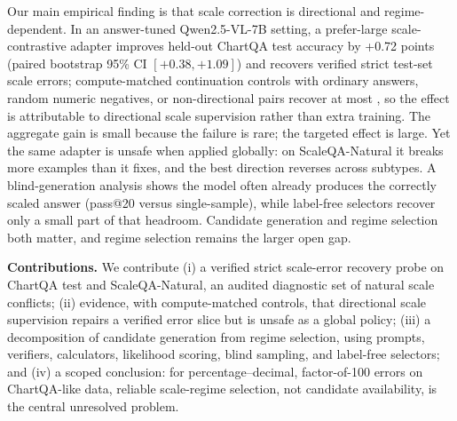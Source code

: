 Our main empirical finding is that scale correction is directional and regime-dependent. In an answer-tuned Qwen2.5-VL-7B setting, a prefer-large scale-contrastive adapter improves held-out ChartQA test accuracy by +0.72 points (paired bootstrap 95\% CI $[+0.38,+1.09]$) and recovers  verified strict test-set scale errors; compute-matched continuation controls with ordinary answers, random numeric negatives, or non-directional pairs recover at most , so the effect is attributable to directional scale supervision rather than extra training. The aggregate gain is small because the failure is rare; the targeted effect is large. Yet the same adapter is unsafe when applied globally: on ScaleQA-Natural it breaks more examples than it fixes, and the best direction reverses across subtypes. A blind-generation analysis shows the model often already produces the correctly scaled answer (pass@20  versus  single-sample), while label-free selectors recover only a small part of that headroom. Candidate generation and regime selection both matter, and regime selection remains the larger open gap.

\noindent\textbf{Contributions.}
We contribute (i) a verified strict scale-error recovery probe on ChartQA test and ScaleQA-Natural, an audited diagnostic set of natural scale conflicts;
(ii) evidence, with compute-matched controls, that directional scale supervision repairs a verified error slice but is unsafe as a global policy;
(iii) a decomposition of candidate generation from regime selection, using prompts, verifiers, calculators, likelihood scoring, blind sampling, and label-free selectors; and
(iv) a scoped conclusion: for percentage--decimal, factor-of-100 errors on ChartQA-like data, reliable scale-regime selection, not candidate availability, is the central unresolved problem.
